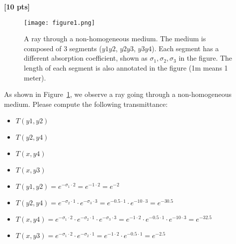 \documentclass[11pt,addpoints,answers]{exam}
\begin{document}
\begin{questions}
\question \textbf{[10 pts]}
\begin{figure}[h]
    \centering
    \texttt{[image: figure1.png]}
    \caption{A ray through a non-homogeneous medium. The medium is composed of 3 segments ($y1y2$, $y2y3$, $y3y4$). Each segment has a different absorption coefficient, shown as $\sigma_1, \sigma_2, \sigma_3$ in the figure. The length of each segment is also annotated in the figure (1m means 1 meter).}
    \label{fig:q1}
\end{figure}

As shown in Figure~\ref{fig:q1}, we observe a ray going through a non-homogeneous medium. 
Please compute the following transmittance:
\begin{itemize}
    \item $T(y1, y2)$
    \item  $T(y2, y4)$
    \item $T(x, y4)$
    \item $T(x, y3)$
\end{itemize} 



\begin{tcolorbox}[fit,height=20cm, width=\textwidth, blank, borderline={0.5pt}{-2pt},halign=left, valign=center, nobeforeafter]



\begin{studentsolution}
\newcommand{\sigmaOne}{1}
\newcommand{\sigmaTwo}{0.5}
\newcommand{\sigmaThree}{10}
\newcommand{\distOne}{2}
\newcommand{\distTwo}{1}
\newcommand{\distThree}{3}

\begin{itemize}
    \item $T(y1,y2) = e^{-\sigma_1 \cdot \distOne} = e^{-\sigmaOne \cdot \distOne} = e^{-2}$
    \item $T(y2,y4) = e^ {-\sigma_2 \cdot \distTwo} \cdot e^ {-\sigma_3 \cdot \distThree} = e^{-\sigmaTwo \cdot \distTwo} \cdot e^{-\sigmaThree \cdot \distThree} = e ^ {-30.5}$
    \item $T(x,y4) = e^{-\sigma_1 \cdot \distOne} \cdot e^ {-\sigma_2 \cdot \distTwo} \cdot e^ {-\sigma_3 \cdot \distThree} = e^{-\sigmaOne \cdot \distOne} \cdot e^{-\sigmaTwo \cdot \distTwo} \cdot e^{-\sigmaThree \cdot \distThree} = e ^ {-32.5}$
    \item $T(x,y3) = e^{-\sigma_1 \cdot \distOne} \cdot e^ {-\sigma_2 \cdot \distTwo}  = e^{-\sigmaOne \cdot \distOne} \cdot e^{-\sigmaTwo \cdot \distTwo} = e ^ {-2.5}$
\end{itemize}
\end{studentsolution}

\end{tcolorbox}
\end{questions}
\end{document}
